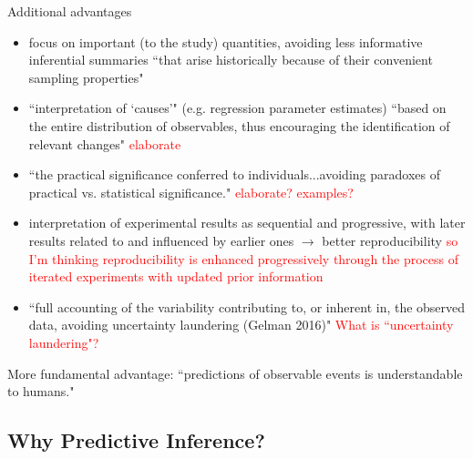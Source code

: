 \documentclass[12pt, a4paper]{article}
\begin{document}
Additional advantages
\begin{itemize}
  \item focus on important (to the study) quantities, avoiding less informative inferential summaries ``that arise historically because of their convenient sampling properties"
  \item ``interpretation of `causes'" (e.g. regression parameter estimates) ``based on the entire distribution of observables, thus encouraging the identification of relevant changes" \textcolor{red}{elaborate}
  \item ``the practical significance conferred to individuals...avoiding paradoxes of practical vs. statistical significance."  \textcolor{red}{elaborate?  examples?}
  \item interpretation of experimental results as sequential and progressive, with later results related to and influenced by earlier ones $\rightarrow$ better reproducibility \textcolor{red}{so I'm thinking reproducibility is enhanced progressively through the process of iterated experiments with updated prior information}
  \item ``full accounting of the variability contributing to, or inherent in, the observed data, avoiding uncertainty laundering (Gelman 2016)" \textcolor{red}{What is ``uncertainty laundering"?}
\end{itemize}

More fundamental advantage:  ``predictions of observable events is understandable to humans."


\subsection{Why Predictive Inference?}
\end{document}
